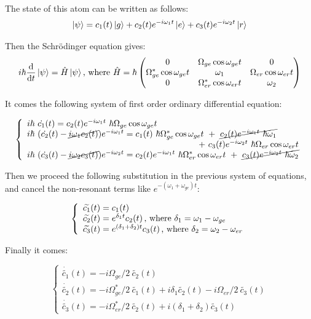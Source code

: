 \documentclass[twoside, open=right
]{scrreprt}
\newcommand{\ff}{\ensuremath{\ket{g}}\xspace}
\newcommand{\ee}{\ensuremath{\ket{e}}\xspace}
\newcommand{\rr}{\ensuremath{\ket{r}}\xspace}
\newcommand{\dd}{\ensuremath{\mathrm d}\xspace}
\newcommand{\om}{\omega}
\newcommand{\Om}{\Omega}
\begin{document}
\par The state of this atom can be written as follows: \[ \ket{\psi} = c_1(t) \ff + c_2(t) e^{-i \om_1 t} \ee + c_3(t) e^{-i \om_2 t} \rr \]

\par Then the Schrödinger equation gives: \[ i \hbar \frac{\dd}{\dd t} \ket{\psi} = \hat{H} \ket{\psi} \text{, where } \hat{H} = \hbar
\begin{pmatrix}
0 & \Om_{ge} \cos{\om_{ge} t} & 0 \\
\Om_{ge}^* \cos{\om_{ge} t} & \om_1 & \Om_{er} \cos{\om_{er} t}\\
0 & \Om_{er}^* \cos{\om_{er} t} & \om_2
\end{pmatrix}  \]

\par It comes the following system of first order ordinary differential equation:

\[ 
\left\{  \begin{array}{l}
i \hbar \ \dot{c_1}(t) =  c_2(t) e^{-i \om_1 t} \ \hbar \Om_{ge} \cos{\om_{ge} t}  \\
i \hbar \ ( \dot{c_2}(t) - \cancel{i \om_1 c_2(t)}) e^{-i \om_1 t}=  c_1(t) \ \hbar \Om_{ge}^* \cos{\om_{ge} t} \ + \ \cancel{c_2(t) e^{-i \om_1 t} \ \hbar \om_1} \\ \hfill + \ c_3(t)  e^{-i \om_2 t} \ \hbar \Om_{er} \cos{\om_{er} t} \\
i \hbar \ ( \dot{c_3}(t) - \cancel{i \om_2 c_3(t)}) e^{-i \om_2 t} =  c_2(t) e^{-i \om_1 t} \ \hbar \Om_{er}^* \cos{\om_{er} t} \ + \ \cancel{c_3(t) e^{-i \om_2 t} \ \hbar \om_2}
\end{array} \right.
\]

\par Then we proceed the following substitution in the previous system of equations, and cancel the non-resonant terms like $e^{-(\om_1 + \om_{ge})t}$:

\[
\left\{  \begin{array}{l}
\widetilde{c_1}(t) = c_1(t) \\
\widetilde{c_2}(t) = e^{\delta_1 t} c_2(t) \text{\,, where } \delta_1 = \om_1 - \om_{ge} \\
\widetilde{c_3}(t) = e^{(\delta_1 + \delta_2) t} c_3(t) \text{\,, where } \delta_2 = \om_2 - \om_{er}
\end{array} \right.
\]

\par Finally it comes:

\[
\left\{  \begin{array}{l}
\dot{\widetilde{c_1}}(t) = -i \Om_{ge}/2 \ \widetilde{c_2}(t) \\
\dot{\widetilde{c_2}}(t) = -i \Om_{ge}^*/2 \ \widetilde{c_1}(t) + i \delta_1 \widetilde{c_2}(t) - i \Om_{er}/2 \ \widetilde{c_3}(t) \\
\dot{\widetilde{c_3}}(t) = -i \Om_{er}^*/2 \ \widetilde{c_2}(t) + i(\delta_1 + \delta_2) \widetilde{c_3}(t)\end{array} \right.
\]
\end{document}
